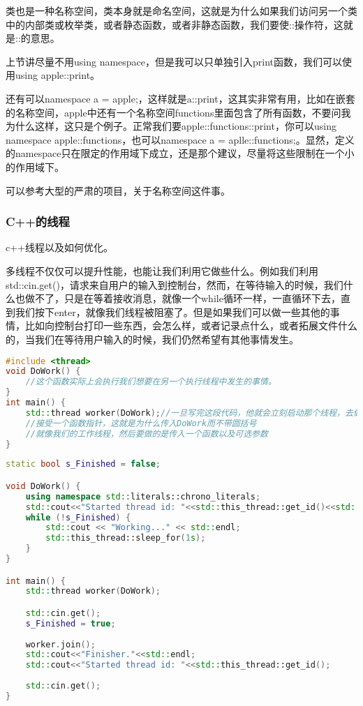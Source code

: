 类也是一种名称空间，类本身就是命名空间，这就是为什么如果我们访问另一个类中的内部类或枚举类，或者静态函数，或者非静态函数，我们要使{\ncodestyle ::}操作符，这就是{\ncodestyle ::}的意思。

上节讲尽量不用{\ncodestyle using namespace}，但是我可以只单独引入{\ncodestyle print}函数，我们可以使用{\ncodestyle using apple::print}。

还有可以{\ncodestyle namespace a = apple;}，这样就是{\ncodestyle a::print}，这其实非常有用，比如在嵌套的名称空间，{\ncodestyle apple}中还有一个名称空间{\ncodestyle functions}里面包含了所有函数，不要问我为什么这样，这只是个例子。正常我们要{\ncodestyle apple::functions::print}，你可以{\ncodestyle using namespace apple::functions}，也可以{\ncodestyle namespace a = aplle::functions;}。显然，定义的namespace只在限定的作用域下成立，还是那个建议，尽量将这些限制在一个小的作用域下。

可以参考大型的严肃的项目，关于名称空间这件事。

\subsubsection{C++的线程}

c++线程以及如何优化。

多线程不仅仅可以提升性能，也能让我们利用它做些什么。例如我们利用{\ncodestyle std::cin.get()}，请求来自用户的输入到控制台，然而，在等待输入的时候，我们什么也做不了，只是在等着接收消息，就像一个{\ncodestyle while}循环一样，一直循环下去，直到我们按下enter，就像我们线程被阻塞了。但是如果我们可以做一些其他的事情，比如向控制台打印一些东西，会怎么样，或者记录点什么，或者拓展文件什么的，当我们在等待用户输入的时候，我们仍然希望有其他事情发生。


\begin{lstlisting}[language=c++]
#include <thread>
void DoWork() {
    //这个函数实际上会执行我们想要在另一个执行线程中发生的事情。
}
int main() {
    std::thread worker(DoWork);//一旦写完这段代码，他就会立刻启动那个线程，去做DoWork里的任务。
    //接受一个函数指针，这就是为什么传入DoWork而不带圆括号
    //就像我们的工作线程，然后要做的是传入一个函数以及可选参数
}
\end{lstlisting}

\begin{lstlisting}[language=c++]
static bool s_Finished = false;

void DoWork() {
    using namespace std::literals::chrono_literals;
    std::cout<<"Started thread id: "<<std::this_thread::get_id()<<std::endl;
    while (!s_Finished) {
        std::cout << "Working..." << std::endl;
        std::this_thread::sleep_for(1s);
    }
}

int main() {
    std::thread worker(DoWork);

    std::cin.get();
    s_Finished = true;
    
    worker.join();
    std::cout<<"Finisher."<<std::endl;
    std::cout<<"Started thread id: "<<std::this_thread::get_id();
    
    std::cin.get();
}
\end{lstlisting}

